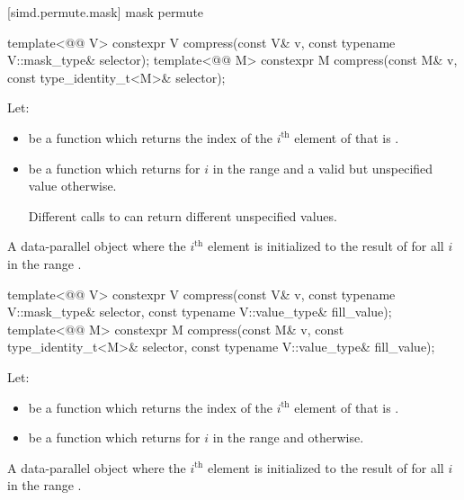 [simd.permute.mask]{ mask permute}

\begin{itemdecl}
template<@@ V>
  constexpr V compress(const V& v, const typename V::mask_type& selector);
template<@@ M>
  constexpr M compress(const M& v, const type_identity_t<M>& selector);
\end{itemdecl}

\begin{itemdescr}
\pnum
Let:
\begin{itemize}
\item
{} be a function which returns the index
of the $i^\text{th}$ element of  that is .
\item
{} be a function which returns
 for $i$ in the range
 and a valid but unspecified value
otherwise.
\begin{note}
Different calls to  can return different unspecified values.
\end{note}
\end{itemize}

\pnum
\returns
A data-parallel object where the $i^\text{th}$
element is initialized to the result of 
for all $i$ in the range .
\end{itemdescr}

\begin{itemdecl}
template<@@ V>
  constexpr V compress(const V& v, const typename V::mask_type& selector,
                       const typename V::value_type& fill_value);
template<@@ M>
  constexpr M compress(const M& v, const type_identity_t<M>& selector,
                       const typename V::value_type& fill_value);
\end{itemdecl}

\begin{itemdescr}
\pnum
Let:
\begin{itemize}
\item
{} be a function which returns the index
of the $i^\text{th}$ element of  that is .
\item
{} be a function which returns
 for $i$ in the range
 and  otherwise.
\end{itemize}

\pnum
\returns
A data-parallel object where the $i^\text{th}$
element is initialized to the result of 
for all $i$ in the range .
\end{itemdescr}

